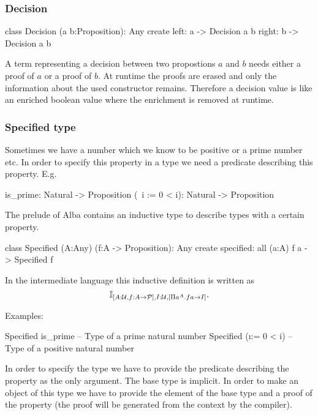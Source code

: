 \subsubsection{Decision}
%
\begin{alba}
  class
    Decision (a b:Proposition): Any
  create
    left:  a -> Decision a b
    right: b -> Decision a b
\end{alba}

A term representing a decision between two propostions $a$ and $b$ needs
either a proof of $a$ or a proof of $b$. At runtime the proofs are erased and
only the information about the used constructor remains. Therefore a decision
value is like an enriched boolean value where the enrichment is removed at
runtime.
\newline




\subsubsection{Specified type}


Sometimes we have a number which we know to be positive or a prime number
etc. In order to specify this property in a type we need a predicate
describing this property. E.g.

\begin{alba}
  is_prime:       Natural -> Proposition
  (\ i := 0 < i): Natural -> Proposition
\end{alba}

The prelude of Alba contains an inductive type to describe types with a
certain property.

\begin{alba}
  class
     Specified (A:Any) (f:A -> Proposition): Any
  create
     specified: all (a:A) f a -> Specified f
\end{alba}

In the intermediate language this inductive definition is written as
$$
\mathbb{I}_{[A:{\cal{U}}, f:A \to {\cal{P}}], I:{\cal{U}}, [\Pi a^A . f a \to I]}.
$$

\noindent Examples:
\begin{alba}
  Specified is_prime       -- Type of a prime natural number
  Specified (\i := 0 < i)  -- Type of a positive natural number
\end{alba}

In order to specify the type we have to provide the predicate describing the
property as the only argument. The base type is implicit. In order to make an
object of this type we have to provide the element of the base type and a
proof of the property (the proof will be generated from the context by the
compiler).

